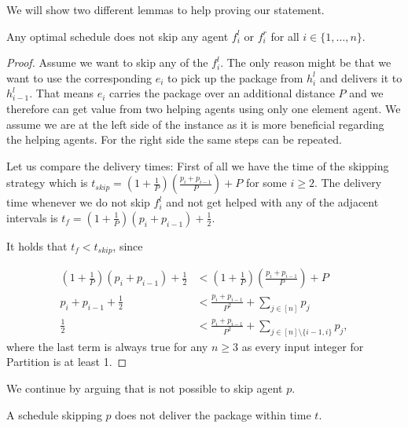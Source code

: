 We will show two different lemmas to help proving our statement.


    \begin{lemma}
    \label{lemma:noskip}
        Any optimal schedule does not skip any agent $f_i^l$ or $f_i^r$ for all $i\in \{1, \dots, n\}$.
    \end{lemma}
    \begin{proof}
        Assume we want to skip any of the $f_i^l$. The only reason might be that we want to use the corresponding $e_i$ to pick up the package from $h_i^l$ and delivers it to $h_{i-1}^l$. That means $e_i$ carries the package over an additional distance $P$ and we therefore can get value from two helping agents using only one element agent. We assume we are at the left side of the instance as it is more beneficial regarding the helping agents. For the right side the same steps can be repeated.

        Let us compare the delivery times: First of all we have the time of the skipping strategy which is $t_{skip}=(1+\frac{1}{P})(\frac{p_i+p_{i-1}}{P})+P$ for some $i\geq 2$. The delivery time whenever we do not skip $f_i^l$ and not get helped with any of the adjacent intervals is $t_f=(1+\frac{1}{P})(p_i + p_{i-1}) + \frac{1}{2}$.

        It holds that $t_f<t_{skip}$, since

        \begin{align*}
                   (1+\frac{1}{P})(p_i+p_{i-1})+\frac{1}{2} &< (1+\frac{1}{P})(\frac{p_i+p_{i-1}}{P})+P\\
                    p_i + p_{i-1} + \frac{1}{2} &< \frac{p_i+p_{i-1}}{P^2} + \sum_{j\in[n]}p_j\\
                    \frac{1}{2} &< \frac{p_i+p_{i-1}}{P^2} + \sum_{j\in[n]\setminus\{i-1,i\}}p_j,
        \end{align*}
        where the last term is always true for any $n\geq 3$ as every input integer for Partition is at least 1. 
    \end{proof}

    We continue by arguing that is not possible to skip agent $p$. 

    \begin{lemma}
        \label{lemma:skipp}
        A schedule skipping $p$ does not deliver the package within time $t$.
    \end{lemma}

